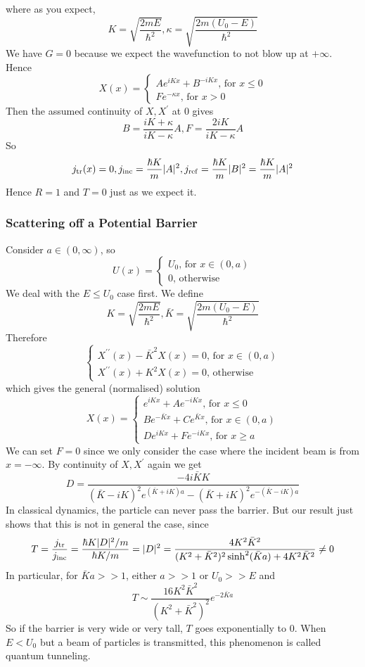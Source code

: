 where as you expect,
$$K=\sqrt{\frac{2mE}{\hbar^2}},\kappa=\sqrt{\frac{2m(U_0-E)}{\hbar^2}}$$
We have $G=0$ because we expect the wavefunction to not blow up at $+\infty$.
Hence
$$X(x)=\begin{cases}
    Ae^{iKx}+B^{-iKx}\text{, for $x\le 0$}\\
    Fe^{-\kappa x}\text{, for $x>0$}
\end{cases}$$
Then the assumed continuity of $X,X^\prime$ at $0$ gives
$$B=\frac{iK+\kappa}{iK-\kappa}A,F=\frac{2iK}{iK-\kappa}A$$
So
$$j_{\rm tr}(x)=0,j_{\rm inc}=\frac{\hbar K}{m}|A|^2,j_{\rm ref}=\frac{\hbar K}{m}|B|^2=\frac{\hbar K}{m}|A|^2$$
Hence $R=1$ and $T=0$ just as we expect it.
\subsubsection{Scattering off a Potential Barrier}
Consider $a\in (0,\infty)$, so
$$U(x)=\begin{cases}
    U_0\text{, for $x\in (0,a)$}\\
    0\text{, otherwise}
\end{cases}$$
We deal with the $E\le U_0$ case first.
We define
$$K=\sqrt{\frac{2mE}{\hbar^2}},\bar{K}=\sqrt{\frac{2m(U_0-E)}{\hbar^2}}$$
Therefore
$$\begin{cases}
    X^{\prime\prime}(x)-\bar{K}^2X(x)=0\text{, for $x\in (0,a)$}\\
    X^{\prime\prime}(x)+K^2X(x)=0\text{, otherwise}
\end{cases}$$
which gives the general (normalised) solution
$$X(x)=\begin{cases}
    e^{iKx}+Ae^{-iKx}\text{, for $x\le 0$}\\
    Be^{-\bar{K}x}+Ce^{\bar{K}x}\text{, for $x\in (0,a)$}\\
    De^{iKx}+Fe^{-iKx}\text{, for $x\ge a$}
\end{cases}$$
We can set $F=0$ since we only consider the case where the incident beam is from $x=-\infty$.
By continuity of $X,X^\prime$ again we get
$$D=\frac{-4i\bar{K}K}{(\bar{K}-iK)^2e^{(\bar{K}+iK)a}-(\bar{K}+iK)^2e^{-(\bar{K}-iK)a}}$$
In classical dynamics, the particle can never pass the barrier.
But our result just shows that this is not in general the case, since
$$T=\frac{j_{\rm tr}}{j_{\rm inc}}=\frac{\hbar K|D|^2/m}{\hbar K/m}=|D|^2=\frac{4K^2\bar{K}^2}{(K^2+\bar{K}^2)^2\sinh^2(\bar{K}a)+4K^2\bar{K}^2}\neq 0$$
In particular, for $\bar{K}a>>1$, either $a>>1$ or $U_0>>E$ and
$$T\sim\frac{16K^2\bar{K}^2}{(K^2+\bar{K}^2)^2}e^{-2\bar{K}a}$$
So if the barrier is very wide or very tall, $T$ goes exponentially to $0$.
When $E<U_0$ but a beam of particles is transmitted, this phenomenon is called quantum tunneling.
